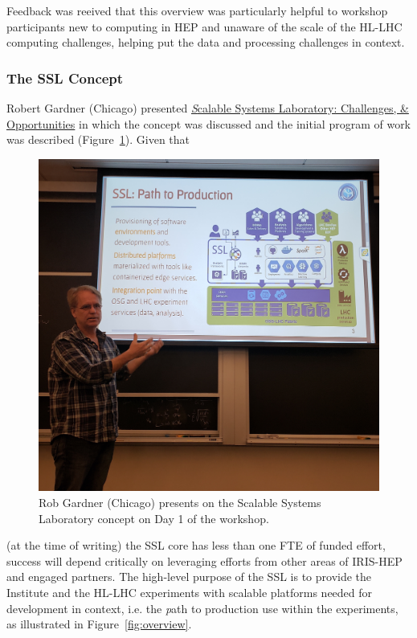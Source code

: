 \documentclass[11pt,letterpaper,fleqn]{article}
\begin{document}
Feedback was reeived that this overview was particularly helpful to workshop participants new to computing in HEP and unaware of the scale of the HL-LHC computing challenges, helping put the data and processing challenges in context.

\subsubsection{The SSL Concept}
\vspace{0.2cm}
Robert Gardner (Chicago) presented \href{https://indico.cern.ch/event/820946/contributions/3461590/attachments/1866979/3070394/2019.06.21_SSL_Overview_Rob.pdf}{\textit Scalable Systems Laboratory: Challenges, \& Opportunities} in which the concept was discussed and the initial program of work was described (Figure~\ref{fig:rwg_ssl}). Given that
\begin{figure}
  \vspace{-0.4cm}
  \includegraphics[width=0.99\linewidth]{figures/rwg_ssl.jpg}
  \vspace{-0.7cm}
  \caption{Rob Gardner (Chicago) presents on the Scalable Systems Laboratory concept on Day 1 of the workshop.}
  \label{fig:rwg_ssl}
\end{figure}
(at the time of writing) the SSL core has less than one FTE of funded effort, success will depend critically on leveraging efforts from other areas of IRIS-HEP and engaged partners. The high-level purpose of the SSL is to provide the Institute and the HL-LHC experiments with scalable platforms needed for development in context, i.e. the {\textit path to production} use within the experiments, as illustrated in Figure~\ref{fig:overview}.
\end{document}
